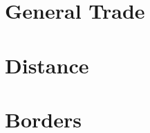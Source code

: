\documentclass[10pt]{article}
\begin{document}
\clearpage\section{General Trade}







\clearpage\section{Distance}








\clearpage\section{Borders}






\end{document}
